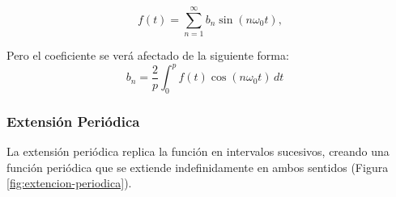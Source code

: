 \begin{equation}\label{eq34}
	f(t) =\sum_{n=1}^{\infty}  b_n \sin(n\omega_0 t),
\end{equation}

Pero el coeficiente se verá afectado de la siguiente forma: ~\cite{fourierCruzFierro}
\begin{equation}\label{eq35}
	b_n = \frac{2}{p} \int_{0}^{p} f(t) \cos(n\omega_0 t) \, dt \quad 
\end{equation}


\subsubsection{Extensión Periódica}
La extensión periódica replica la función en intervalos sucesivos, creando una función periódica que se extiende indefinidamente en ambos sentidos (Figura \ref{fig:extencion-periodica}).

